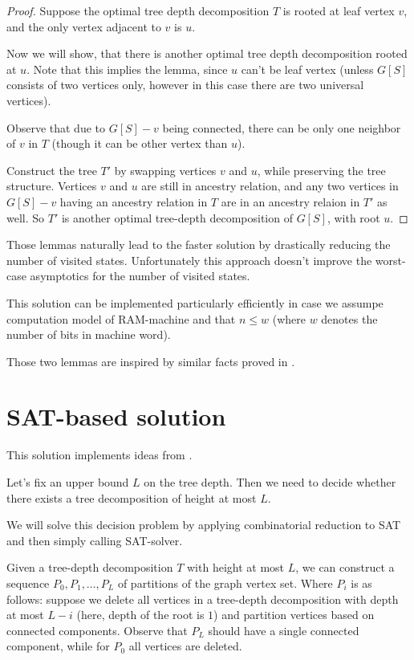 \documentclass[a4paper,UKenglish,cleveref, autoref, thm-restate]{lipics-v2019}
\begin{document}
\begin{proof} Suppose the optimal tree depth decomposition $T$ is rooted at leaf vertex $v$, and the only vertex adjacent to $v$ is $u$.

  Now we will show, that there is another optimal tree depth decomposition rooted at $u$. Note that this implies the lemma,
  since $u$ can't be leaf vertex (unless $G[S]$ consists of two vertices only, however in this case there are two universal vertices).

  Observe that due to $G[S] - v$ being connected, there can be only one neighbor of $v$ in $T$ (though it can be other vertex than $u$).

  Construct the tree $T'$ by swapping vertices $v$ and $u$, while preserving the tree structure. Vertices $v$ and $u$ are still in ancestry
  relation, and any two vertices in $G[S] - v$ having an ancestry relation in $T$  are in an ancestry relaion in $T'$ as well. So $T'$ is another
  optimal tree-depth decomposition of $G[S]$, with root $u$.
\end{proof}

Those lemmas naturally lead to the faster solution by drastically reducing the number of visited states. Unfortunately this
approach doesn't improve the worst-case asymptotics for the number of visited states.

This solution can be implemented particularly efficiently in case we assumpe computation model of RAM-machine
and that $n \le w$ (where $w$ denotes the number of bits in machine word).

Those two lemmas are inspired by similar facts proved in \cite{sanchez2017treedepth}.

\section{SAT-based solution}

This solution implements ideas from \cite{ganian2019sat}.

Let's fix an upper bound $L$ on the tree depth. Then we need to decide whether there exists a tree decomposition of
height at most $L$.

We will solve this decision problem by applying combinatorial reduction to SAT and then simply calling SAT-solver.

Given a tree-depth decomposition $T$ with height at most $L$, we can construct a sequence $P_0, P_1, \ldots, P_L$
of partitions of the graph vertex set. Where $P_i$ is as follows: suppose we delete all vertices in a
tree-depth decomposition with depth at most $L - i$ (here, depth of the root is $1$) and partition vertices based on
connected components. Observe that $P_L$ should have a single connected component, while for $P_0$ all vertices
are deleted. 
\end{document}
